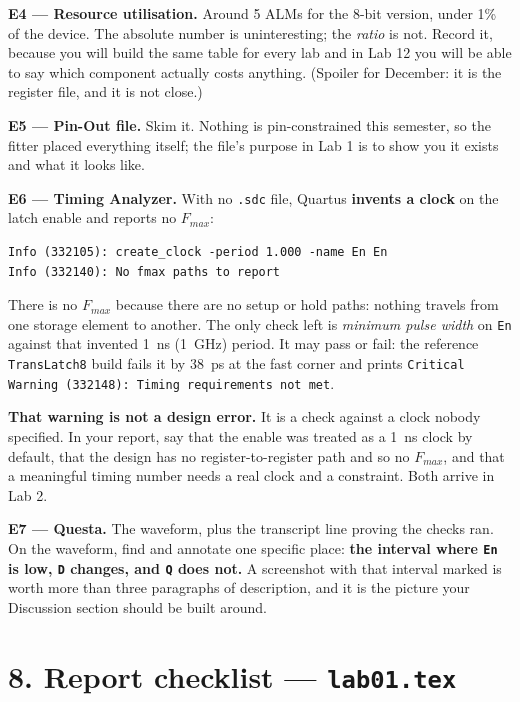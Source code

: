 \documentclass[11pt]{article}
\newcommand{\code}[1]{\texttt{#1}}
\begin{document}
\vspace{4pt}
\textbf{E4 --- Resource utilisation.} Around 5 ALMs for the 8-bit version, under 1\%
of the device. The absolute number is uninteresting; the \emph{ratio} is not. Record
it, because you will build the same table for every lab and in Lab 12 you will be
able to say which component actually costs anything. (Spoiler for December: it is the
register file, and it is not close.)

\vspace{4pt}
\textbf{E5 --- Pin-Out file.} Skim it. Nothing is pin-constrained this semester, so
the fitter placed everything itself; the file's purpose in Lab 1 is to show you it
exists and what it looks like.

\vspace{4pt}
\textbf{E6 --- Timing Analyzer.} With no \code{.sdc} file, Quartus \textbf{invents a
clock} on the latch enable and reports no $F_{max}$:
\begin{lstlisting}
Info (332105): create_clock -period 1.000 -name En En
Info (332140): No fmax paths to report
\end{lstlisting}
There is no $F_{max}$ because there are no setup or hold paths: nothing travels from
one storage element to another. The only check left is \emph{minimum pulse width}
on \code{En} against that invented 1~ns (1~GHz) period. It may pass or fail: the
reference \code{TransLatch8} build fails it by 38~ps at the fast corner and prints
\code{Critical Warning (332148): Timing requirements not met}.

\textbf{That warning is not a design error.} It is a check against a clock nobody
specified. In your report, say that the enable was treated as a 1~ns clock by
default, that the design has no register-to-register path and so no $F_{max}$, and
that a meaningful timing number needs a real clock and a constraint. Both arrive in
Lab 2.

\vspace{4pt}
\textbf{E7 --- Questa.} The waveform, plus the transcript line proving the checks
ran. On the waveform, find and annotate one specific place: \textbf{the interval
where \code{En} is low, \code{D} changes, and \code{Q} does not.} A screenshot with
that interval marked is worth more than three paragraphs of description, and it is
the picture your Discussion section should be built around.

\section*{8. Report checklist --- \code{lab01.tex}}
\end{document}
